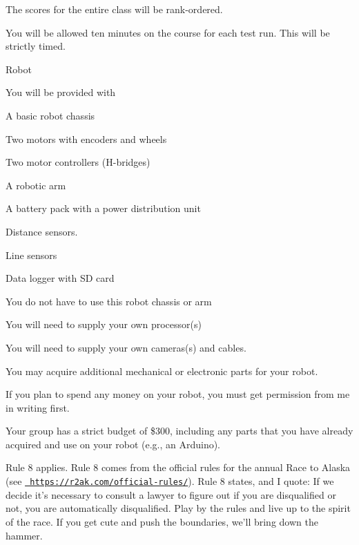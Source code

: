 \begin{DoxyItemize}
\item The scores for the entire class will be rank-\/ordered.
\item You will be allowed ten minutes on the course for each test run. This will be strictly timed.
\item Robot
\begin{DoxyItemize}
\item You will be provided with
\begin{DoxyItemize}
\item A basic robot chassis
\item Two motors with encoders and wheels
\item Two motor controllers (H-\/bridges)
\item A robotic arm
\item A battery pack with a power distribution unit
\item Distance sensors.
\item Line sensors
\item Data logger with SD card
\end{DoxyItemize}
\item You do not have to use this robot chassis or arm
\item You will need to supply your own processor(s)
\item You will need to supply your own cameras(s) and cables.
\item You may acquire additional mechanical or electronic parts for your robot.
\item If you plan to spend any money on your robot, you must get permission from me in writing first.
\item Your group has a strict budget of \$300, including any parts that you have already acquired and use on your robot (e.\+g., an Arduino).
\end{DoxyItemize}
\item Rule 8 applies. Rule 8 comes from the official rules for the annual Race to Alaska (see \href{https://r2ak.com/official-rules/}{\texttt{ https\+://r2ak.\+com/official-\/rules/}}). Rule 8 states, and I quote\+: If we decide it’s necessary to consult a lawyer to figure out if you are disqualified or not, you are automatically disqualified. Play by the rules and live up to the spirit of the race. If you get cute and push the boundaries, we’ll bring down the hammer. 
\end{DoxyItemize}